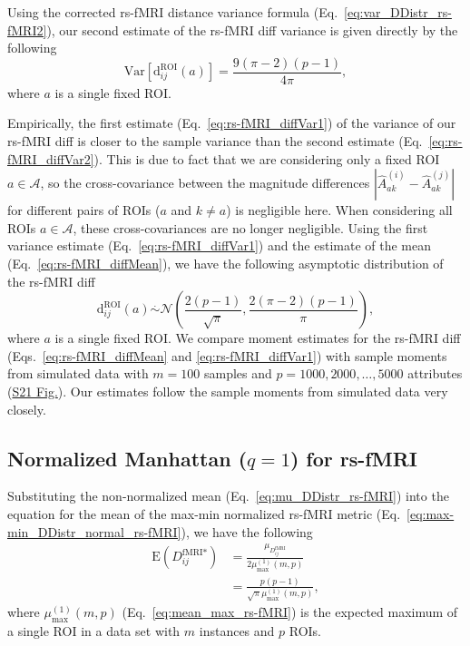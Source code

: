 \documentclass[10pt,letterpaper]{article}
\begin{document}
Using the corrected rs-fMRI distance variance formula (Eq.~\ref{eq:var_DDistr_rs-fMRI2}), our second estimate of the rs-fMRI diff variance is given directly by the following
%
\begin{equation}\label{eq:rs-fMRI_diffVar2}
\text{Var}\left[\text{d}^\text{ROI}_{ij}(a)\right] = \frac{9(\pi - 2)(p - 1)}{4\pi},
\end{equation}
%
where $a$ is a single fixed ROI.

Empirically, the first estimate (Eq.~\ref{eq:rs-fMRI_diffVar1}) of the variance of our rs-fMRI diff is closer to the sample variance than the second estimate (Eq.~\ref{eq:rs-fMRI_diffVar2}). This is due to fact that we are considering only a fixed ROI $a \in \mathcal{A}$, so the cross-covariance between the magnitude differences $|\hat{A}^{(i)}_{ak} - \hat{A}^{(j)}_{ak}|$ for different pairs of ROIs ($a$ and $k \neq a$) is negligible here. When considering all ROIs $a \in \mathcal{A}$, these cross-covariances are no longer negligible. Using the first variance estimate (Eq.~\ref{eq:rs-fMRI_diffVar1}) and the estimate of the mean (Eq.~\ref{eq:rs-fMRI_diffMean}), we have the following asymptotic distribution of the rs-fMRI diff
%
\begin{equation}
\text{d}^\text{ROI}_{ij}(a) \overset{.}{\sim} \mathcal{N}\left(\frac{2(p-1)}{\sqrt{\pi}},\frac{2(\pi - 2)(p-1)}{\pi}\right),
\end{equation}
%
where $a$ is a single fixed ROI. We compare moment estimates for the rs-fMRI diff (Eqs.~\ref{eq:rs-fMRI_diffMean} and \ref{eq:rs-fMRI_diffVar1}) with sample moments from simulated data with $m=100$ samples and $p=1000,2000,\dots,5000$ attributes (\hyperlink{S21_Fig}{S21 Fig.}). Our estimates follow the sample moments from simulated data very closely.

\subsection{Normalized Manhattan \texorpdfstring{($q=1$)}{} for rs-fMRI}

Substituting the non-normalized mean (Eq.~\ref{eq:mu_DDistr_rs-fMRI}) into the equation for the mean of the max-min normalized rs-fMRI metric (Eq.~\ref{eq:max-min_DDistr_normal_rs-fMRI}), we have the following
%
\begin{equation}\label{eq:mu_max-min_rs-fMRI}
\begin{aligned}
\text{E}\left(D^\text{fMRI*}_{ij}\right) &= \frac{\mu_{D^\text{fMRI}_{ij}}}{2\mu^{(1)}_\text{max}(m,p)} \\
&= \frac{p(p-1)}{\sqrt{\pi}\mu^{(1)}_\text{max}(m,p)},
\end{aligned}
\end{equation}
%
where $\mu^{(1)}_\text{max}(m,p)$ (Eq.~\ref{eq:mean_max_rs-fMRI}) is the expected maximum of a single ROI in a data set with $m$ instances and $p$ ROIs.
\end{document}
